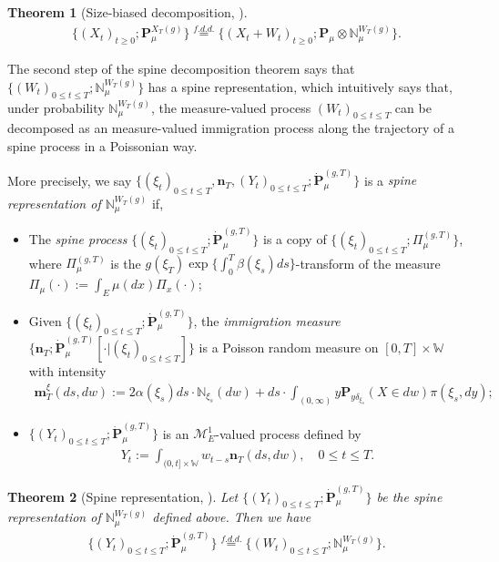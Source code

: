 \documentclass[12pt,a4paper]{amsart}
\newtheorem{thm}{Theorem}[section]
\theoremstyle{definition}
\numberwithin{equation}{section}
\begin{document}
\begin{thm}[Size-biased decomposition,  \cite{RenSongSun2017Spine}]\label{thm: size-biased decomposition}
  \begin{align}
    \{(X_t)_{t\geq 0}; \mathbf P_\mu^{X_T(g)}\}
    \overset{f.d.d.}{=} \{(X_t+W_t)_{t\geq 0}; \mathbf P_\mu  \otimes \mathbb N^{W_T(g)}_\mu\}.
  \end{align}
\end{thm}
The second step of the spine decomposition theorem says that $\{(W_t)_{0\leq t\leq T}; \mathbb N^{W_T(g)}_\mu\}$ has a spine representation, which intuitively says that, under probability $\mathbb N_\mu^{W_T(g)}$, the measure-valued process $(W_t)_{0\leq t\leq T}$ can be decomposed as an measure-valued immigration process along the trajectory of a spine process in a Poissonian way. 

More precisely,
we say $\{(\xi_t)_{0\leq t\leq T}, \mathbf n_T,  (Y_t)_{ 0\leq t\leq T}; \dot {\mathbf P}^{(g,T)}_\mu\}$ is a \emph{spine representation of $\mathbb N^{W_T(g)}_\mu$}  if,
\begin{itemize}
\item
	The \emph{spine process} $\{(\xi_t)_{0\leq t\leq T}; \dot{\mathbf P}^{(g,T)}_\mu\}$ is a copy of $\{(\xi_t)_{0\leq t\leq T}; \Pi^{(g,T)}_{\mu}\}$, where $\Pi^{(g,T)}_{\mu}$ is the $g(\xi_T) \exp\{\int_0^T \beta(\xi_s)ds\}$-transform of the measure $\Pi_{\mu}(\cdot):=\int_{E}\mu(dx)\Pi_x(\cdot) $;
\item
	Given $\{(\xi_t)_{0\leq t\leq T}; \dot{\mathbf P}^{(g,T)}_\mu\}$, the \emph{immigration measure} $\{\mathbf n_T; \dot{\mathbf P}^{(g,T)}_\mu[\cdot |(\xi_t)_{0\leq t\leq T}]\}$ is a Poisson random measure on $[0,T] \times \mathbb W$ with intensity
  \begin{align}
    \mathbf m^\xi_T(ds,dw)
    := 2 \alpha(\xi_s) ds \cdot \mathbb N_{\xi_s}(dw) + ds \cdot \int_{(0,\infty)} y \mathbf P_{y\delta_{\xi_s}}(X\in dw) \pi(\xi_s,dy);
  \end{align}
\item
	$\{(Y_t)_{0\leq t\leq T}; \dot{\mathbf P}^{(g,T)}_\mu\}$ is an $\mathcal M^1_E$-valued process defined by
  \begin{align}
    Y_t
    := \int_{(0,t] \times \mathbb W} w_{t-s} \mathbf n_T(ds,dw),
    \quad 0 \leq t\leq T.
  \end{align}
\end{itemize}
\begin{thm}[Spine representation, \cite{RenSongSun2017Spine}]\label{thm: spine representation}
	Let $\{(Y_t)_{0\leq t\leq T}; \dot {\mathbf P}^{(g,T)}_\mu\}$ be the spine representation of $\mathbb N^{W_T(g)}_\mu$ defined above.
	Then we have
  \begin{align}
    \{(Y_t)_{0\leq t\leq T}; \dot{\mathbf P}^{(g,T)}_\mu\}
    \overset{f.d.d.}{=} \{(W_t)_{0\leq t\leq T}; \mathbb N_\mu^{W_T(g)}\}.
  \end{align}
\end{thm}
\end{document}
